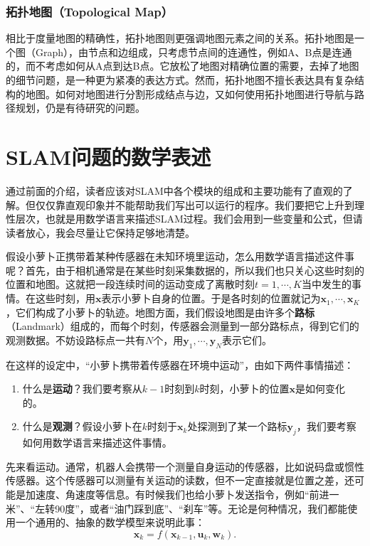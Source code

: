 \subsubsection{拓扑地图（Topological Map）}
相比于度量地图的精确性，拓扑地图则更强调地图元素之间的关系。拓扑地图是一个图（Graph），由节点和边组成，只考虑节点间的连通性，例如A、B点是连通的，而不考虑如何从A点到达B点。它放松了地图对精确位置的需要，去掉了地图的细节问题，是一种更为紧凑的表达方式。然而，拓扑地图不擅长表达具有复杂结构的地图。如何对地图进行分割形成结点与边，又如何使用拓扑地图进行导航与路径规划，仍是有待研究的问题。

\section{SLAM问题的数学表述}

通过前面的介绍，读者应该对SLAM中各个模块的组成和主要功能有了直观的了解。但仅仅靠直观印象并不能帮助我们写出可以运行的程序。我们要把它上升到理性层次，也就是用数学语言来描述SLAM过程。我们会用到一些变量和公式，但请读者放心，我会尽量让它保持足够地清楚。

假设小萝卜正携带着某种传感器在未知环境里运动，怎么用数学语言描述这件事呢？首先，由于相机通常是在某些时刻采集数据的，所以我们也只关心这些时刻的位置和地图。这就把一段连续时间的运动变成了离散时刻$t=1, \cdots, K$当中发生的事情。在这些时刻，用$\bm{x}$表示小萝卜自身的位置。于是各时刻的位置就记为$ \bm{x}_1, \cdots, \bm{x}_K$，它们构成了小萝卜的轨迹。地图方面，我们假设地图是由许多个\textbf{路标}（Landmark）组成的，而每个时刻，传感器会测量到一部分路标点，得到它们的观测数据。不妨设路标点一共有$N$个，用$\bm{y}_1, \cdots, \bm{y}_N$表示它们。

在这样的设定中，“小萝卜携带着传感器在环境中运动”，由如下两件事情描述：

\begin{enumerate}
	\item 什么是\textbf{运动}？我们要考察从$k-1$时刻到$k$时刻，小萝卜的位置$\bm{x}$是如何变化的。
	\item 什么是\textbf{观测}？假设小萝卜在$k$时刻于$\bm{x}_k$处探测到了某一个路标$\bm{y}_j$，我们要考察如何用数学语言来描述这件事情。
\end{enumerate}

先来看运动。通常，机器人会携带一个测量自身运动的传感器，比如说码盘或惯性传感器。这个传感器可以测量有关运动的读数，但不一定直接就是位置之差，还可能是加速度、角速度等信息。有时候我们也给小萝卜发送指令，例如“前进一米”、“左转90度”，或者“油门踩到底”、“刹车”等。无论是何种情况，我们都能使用一个通用的、抽象的数学模型来说明此事：
\begin{equation}	
{\bm{x}_k} = f\left( {{\bm{x}_{k - 1}},{\bm{u}_k}, \bm{w}_k} \right).
\end{equation}

